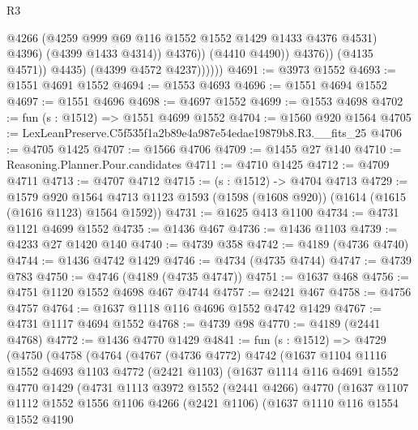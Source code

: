 \begin{lexlean}{R3}
\begin{coremodule}
                                @4266
                                (@4259 @999 @69 @116 @1552 @1552 @1429 @1433 @4376 @4531)
                                @4396)
                              (@4399 @1433 @4314))
                            @4376))
                        (@4410 @4490))
                      @4376))
                  (@4135 @4571))
                @4435)
              (@4399 @4572 @4237))))))
@4691 := @3973 @1552
@4693 := @1551 @4691 @1552
@4694 := @1553 @4693
@4696 := @1551 @4694 @1552
@4697 := @1551 @4696
@4698 := @4697 @1552
@4699 := @1553 @4698
@4702 := fun (s : @1512) => @1551 @4699 @1552
@4704 := @1560 @920 @1564
@4705 := LexLeanPreserve.C5f535f1a2b89e4a987e54edae19879b8.R3.__fits_25
@4706 := @4705 @1425
@4707 := @1566 @4706
@4709 := @1455 @27 @140
@4710 := Reasoning.Planner.Pour.candidates
@4711 := @4710 @1425
@4712 := @4709 @4711
@4713 := @4707 @4712
@4715 := (s : @1512) -> @4704 @4713
@4729 := @1579
    @920
    @1564
    @4713
    @1123
    @1593
    (@1598 (@1608 @920))
    (@1614 (@1615 (@1616 @1123) @1564 @1592))
@4731 := @1625 @413 @1100
@4734 := @4731 @1121 @4699 @1552
@4735 := @1436 @467
@4736 := @1436 @1103
@4739 := @4233 @27 @1420 @140
@4740 := @4739 @358
@4742 := @4189 (@4736 @4740)
@4744 := @1436 @4742 @1429
@4746 := @4734 (@4735 @4744)
@4747 := @4739 @783
@4750 := @4746 (@4189 (@4735 @4747))
@4751 := @1637 @468
@4756 := @4751 @1120 @1552 @4698 @467 @4744
@4757 := @2421 @467
@4758 := @4756 @4757
@4764 := @1637 @1118 @116 @4696 @1552 @4742 @1429
@4767 := @4731 @1117 @4694 @1552
@4768 := @4739 @98
@4770 := @4189 (@2441 @4768)
@4772 := @1436 @4770 @1429
@4841 := fun (s : @1512) =>
  @4729
    (@4750
      (@4758
        (@4764
          (@4767
            (@4736 @4772)
            @4742
            (@1637
              @1104
              @1116
              @1552
              @4693
              @1103
              @4772
              (@2421 @1103)
              (@1637
                @1114
                @116
                @4691
                @1552
                @4770
                @1429
                (@4731
                  @1113
                  @3972
                  @1552
                  (@2441 @4266)
                  @4770
                  (@1637
                    @1107
                    @1112
                    @1552
                    @1556
                    @1106
                    @4266
                    (@2421 @1106)
                    (@1637
                      @1110
                      @116
                      @1554
                      @1552
                      @4190

\end{coremodule}
\end{lexlean}
